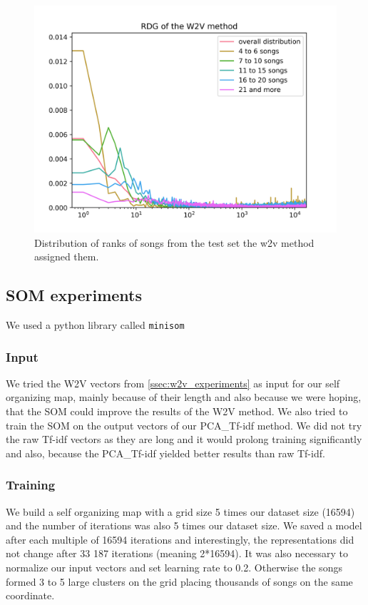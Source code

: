 \begin{figure}[hbt!]
    \centering
	\includegraphics[width=120mm]{./img/w2v_graph.png}
	\caption{Distribution of ranks of songs from the test set the w2v method assigned them.}
	\label{fig:w2v_distribution}
\end{figure}

\subsection{SOM experiments}
We used a python library called \texttt{minisom} \cite{Vettigli2019}
\subsubsection{Input}
We tried the W2V vectors from \ref{ssec:w2v_experiments} as input for our self organizing map, mainly because of their length and also because we were hoping, that the SOM could improve the results of the W2V method. We also tried to train the SOM on the output vectors of our PCA\_Tf-idf method. We did not try the raw Tf-idf vectors as they are long and it would prolong training significantly and also, because the PCA\_Tf-idf yielded better results than raw Tf-idf.

\subsubsection{Training}
We build a self organizing map with a grid size 5 times our dataset size (16594) and the number of iterations was also 5 times our dataset size. We saved a model after each multiple of 16594 iterations and interestingly, the representations did not change after 33 187 iterations (meaning 2*16594). It was also necessary to normalize our input vectors and set learning rate to 0.2. Otherwise the songs formed 3 to 5 large clusters on the grid placing thousands of songs on the same coordinate. 
